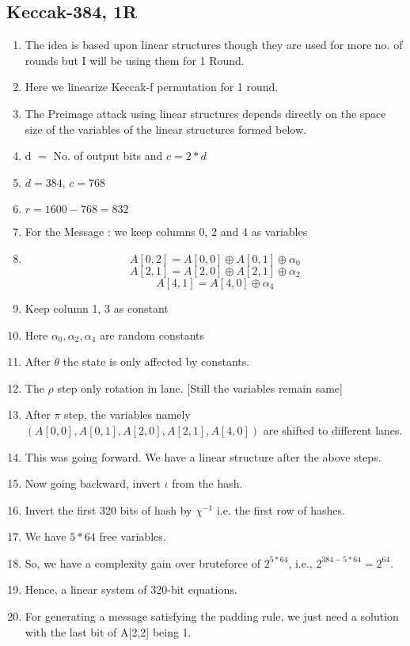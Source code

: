 \documentclass{article}
\begin{document}
\subsection{Keccak-384, 1R}
\begin{enumerate}
    \item The idea is based upon linear structures though they are used for more no. of rounds but I will be using them for 1 Round.
    \item Here we linearize Keccak-f permutation for 1 round.
    \item The Preimage attack using linear structures depends directly on the space size of the variables of the linear structures formed below.
    \item d $=$ No. of output bits and $c = 2*d$
    \item $d = 384$, $c = 768$
    \item $r = 1600 - 768 = 832$
    \item For the Message : we keep columns 0, 2 and 4 as variables
    \item \[ A[0, 2] = A[0, 0] \oplus A[0, 1] \oplus \alpha_0 \]
         \[ A[2, 1] = A[2, 0] \oplus A[2, 1] \oplus \alpha_2 \]
         \[ A[4, 1] = A[4, 0] \oplus \alpha_4 \]
    \item Keep column 1, 3 as constant
    \item Here $\alpha_0, \alpha_2, \alpha_4$ are random constants
    \item After $\theta$ the state is only affected by constants.
    \item The $\rho$ step only rotation in lane. [Still the variables remain same]
    \item After $\pi$ step, the variables namely $(A[0,0], A[0,1], A[2,0], A[2,1], A[4,0])$ are shifted to different lanes.
    \item This was going forward. We have a linear structure after the above steps.
    \item Now going backward, invert $\iota$ from the hash.
    \item Invert the first 320 bits of hash by $\chi^{-1}$ i.e. the first row of hashes.
    \item We have $5*64$ free variables.
    \item So, we have a complexity gain over bruteforce of $2^{5*64}$, i.e., $2^{384 - 5*64} = 2^{64}$.
    \item Hence, a linear system of 320-bit equations.
    \item For generating a message satisfying the padding rule, we just need a solution with the last bit of A[2,2] being 1.

\end{enumerate}
\end{document}
